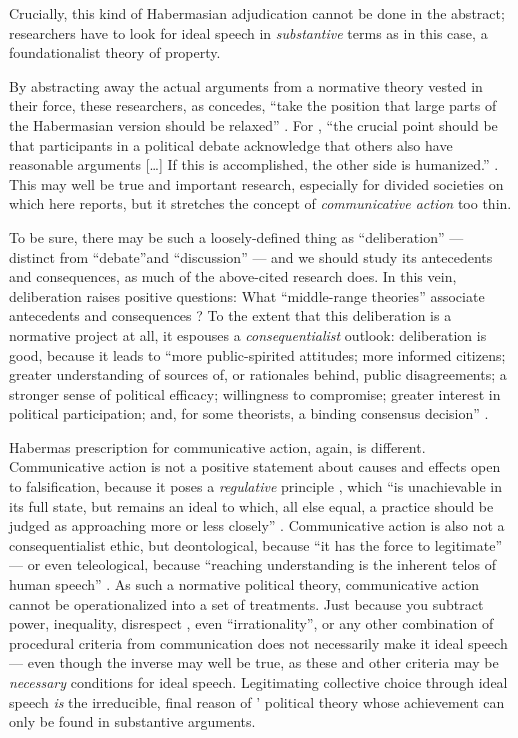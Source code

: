 Crucially, this kind of Habermasian adjudication cannot be done in the abstract; researchers have to look for ideal speech in \emph{substantive} terms as in this case, a foundationalist theory of property.

By abstracting away the actual arguments from a normative theory vested in their force, these researchers, as \citeauthor{Steiner2012} concedes, ``take the position that large parts of the Habermasian version should be relaxed'' \citep[150]{Steiner2012}.
For \citeauthor{Steiner2012}, ``the crucial point should be that participants in a political debate acknowledge that others also have reasonable arguments 
[\ldots]
If this is accomplished, the other side is humanized.'' \citeyearpar[150]{Steiner2012}.
This may well be true and important research, especially for divided societies on which \citeauthor{Steiner2012} here reports, but it stretches the concept of \emph{communicative action} too thin.

To be sure, there may be such a loosely-defined thing as ``deliberation'' --- distinct from ``debate''and ``discussion''  \citep[384]{Landwehr2010} --- and we should study its antecedents and consequences, as much of the above-cited research does.
In this vein, deliberation raises positive questions: What ``middle-range theories'' associate antecedents and consequences \citep{Mutz2008}? 
To the extent that this deliberation is a normative project at all, it espouses a \emph{consequentialist} outlook: deliberation is good, because it leads to ``more public-spirited attitudes; more informed citizens; greater understanding of sources of, or rationales behind, public disagreements; a stronger sense of political efficacy; willingness to compromise; greater interest in political participation; and, for some theorists, a binding consensus decision'' \citep[524]{Mutz2008}.

Habermas prescription for communicative action, again, is different.
Communicative action is not a positive statement about causes and effects open to falsification, because it poses a \emph{regulative} principle \citep{Kant1781}, which ``is unachievable in its full state, but remains an ideal to which, all else equal, a practice should be judged as approaching more or less closely'' \cite[80]{Mansbridge2010a}.
Communicative action is also not a consequentialist ethic, but deontological, because ``it has the force to legitimate'' \citep[147]{Habermas2008} --- or even teleological, because ``reaching understanding is the inherent telos of human speech'' \cite[287]{Habermas1984}.
As such a normative political theory, communicative action cannot be operationalized into a set of treatments.
Just because you subtract power, inequality, disrespect \citep{Steenbergen2003}, even ``irrationality'', or any other combination of procedural criteria from communication  does not necessarily make it ideal speech --- even though the inverse may well be true, as these and other criteria may be \emph{necessary} conditions for ideal speech.
Legitimating collective choice through ideal speech \emph{is} the irreducible, final reason of \citeauthor{Habermas1984}' political theory whose achievement can only be found in substantive arguments.


